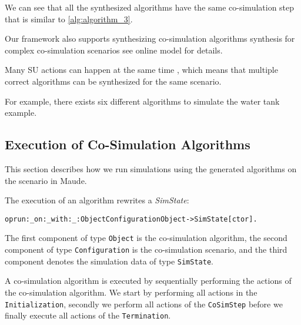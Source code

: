 \begin{example}
We can see that all the synthesized algorithms have the same co-simulation step that is similar to \cref{alg:algorithm_3}.
\end{example}

Our framework also supports synthesizing co-simulation algorithms synthesis for complex co-simulation scenarios see online model for details.

Many SU actions can happen at the same time , which means that multiple correct algorithms can be synthesized for the same scenario.

For example, there exists six different algorithms to simulate the water tank example.

\subsection{Execution of Co-Simulation Algorithms}
This section describes how we run simulations using the generated algorithms on the scenario in Maude.

The execution of an algorithm rewrites a \emph{SimState}:
\small
\begin{alltt}
op run:_on:_with:_ : Object Configuration Object -> SimState [ctor]. 
\end{alltt}
\normalsize
The first component of type \texttt{Object} is the co-simulation algorithm, the second component of type \texttt{Configuration} is the co-simulation scenario, and the third component denotes the simulation data of type \texttt{SimState}.

A co-simulation algorithm is executed by sequentially performing the actions of the co-simulation algorithm.
We start by performing all actions in the \texttt{Initialization}, secondly we perform all actions of the \texttt{CoSimStep} before we finally execute all actions of the \texttt{Termination}. 

